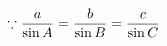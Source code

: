 \documentclass[preview]{standalone}
\begin{document}
\begin{align*}
\special{dvisvgm:raw <g id='unique000'>}\because \frac{a}{\sin A}=\frac{b}{\sin B}=\frac{c}{\sin C}\special{dvisvgm:raw </g>}
\end{align*}
\end{document}
